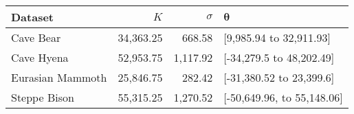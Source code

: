 
\begin{tabular}{lrrl}
\toprule
Dataset & $K$ & $\sigma$ & $\bm{\theta}$\\
\midrule
Cave Bear       & 34{\small,}363.25 & 668.58            & [9{\small,}985.94 to 32{\small,}911.93]\\
Cave Hyena      & 52{\small,}953.75 & 1{\small,}117.92  & [-34{\small,}279.5 to 48{\small,}202.49]\\
Eurasian Mammoth& 25{\small,}846.75 & 282.42            & [-31{\small,}380.52 to 23{\small,}399.6]\\
Steppe Bison    & 55{\small,}315.25 & 1{\small,}270.52  & [-50{\small,}649.96, to 55{\small,}148.06]\\
\bottomrule
\end{tabular}
